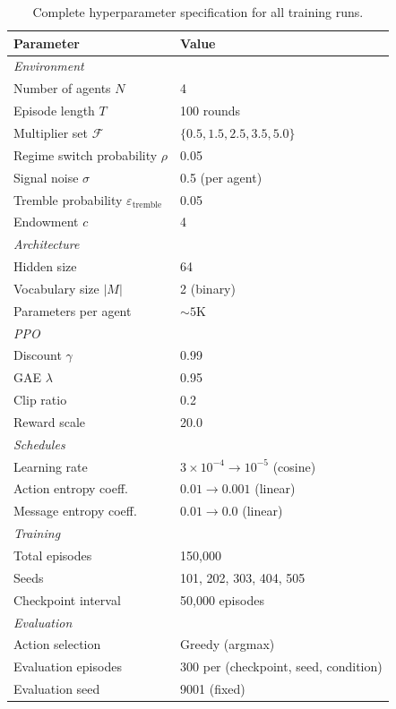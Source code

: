 \documentclass[
  10pt,
  letterpaper,
]{article}
\begin{document}
\begin{table}[h]
  \caption{Complete hyperparameter specification for all training runs.}
  
  \centering
  \small
  \begin{tabular}{ll}
    \toprule
    Parameter & Value \\
    \midrule
    \multicolumn{2}{l}{\textit{Environment}} \\
    Number of agents $N$ & 4 \\
    Episode length $T$ & 100 rounds \\
    Multiplier set $\mathcal{F}$ & $\{0.5, 1.5, 2.5, 3.5, 5.0\}$ \\
    Regime switch probability $\rho$ & 0.05 \\
    Signal noise $\sigma$ & 0.5 (per agent) \\
    Tremble probability $\varepsilon_{\text{tremble}}$ & 0.05 \\
    Endowment $c$ & 4 \\
    \midrule
    \multicolumn{2}{l}{\textit{Architecture}} \\
    Hidden size & 64 \\
    Vocabulary size $|M|$ & 2 (binary) \\
    Parameters per agent & ${\sim}5$K \\
    \midrule
    \multicolumn{2}{l}{\textit{PPO}} \\
    Discount $\gamma$ & 0.99 \\
    GAE $\lambda$ & 0.95 \\
    Clip ratio & 0.2 \\
    Reward scale & 20.0 \\
    \midrule
    \multicolumn{2}{l}{\textit{Schedules}} \\
    Learning rate & $3 \times 10^{-4} \to 10^{-5}$ (cosine) \\
    Action entropy coeff. & $0.01 \to 0.001$ (linear) \\
    Message entropy coeff. & $0.01 \to 0.0$ (linear) \\
    \midrule
    \multicolumn{2}{l}{\textit{Training}} \\
    Total episodes & 150,000 \\
    Seeds & 101, 202, 303, 404, 505 \\
    Checkpoint interval & 50,000 episodes \\
    \midrule
    \multicolumn{2}{l}{\textit{Evaluation}} \\
    Action selection & Greedy (argmax) \\
    Evaluation episodes & 300 per (checkpoint, seed, condition) \\
    Evaluation seed & 9001 (fixed) \\
    \bottomrule
  \end{tabular}
\end{table}
\end{document}
